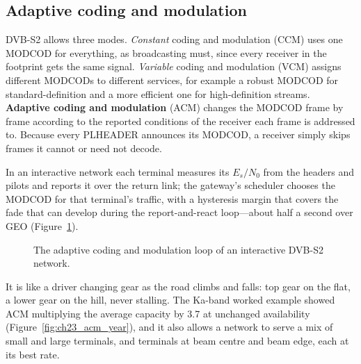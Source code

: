 \subsection{Adaptive coding and modulation}

DVB-S2 allows three modes. \emph{Constant} coding and modulation (CCM) uses one MODCOD for
everything, as broadcasting must, since every receiver in the footprint gets the same signal.
\emph{Variable} coding and modulation (VCM) assigns different MODCODs to different services,
for example a robust MODCOD for standard-definition and a more efficient one for
high-definition streams. \textbf{Adaptive coding and modulation} (ACM) changes the MODCOD frame by
frame according to the reported conditions of the receiver each frame is addressed to. Because
every PLHEADER announces its MODCOD, a receiver simply skips frames it cannot or need not
decode.


In an interactive network each terminal measures its $E_s/N_0$ from the headers and pilots and
reports it over the return link; the gateway's scheduler chooses the MODCOD for that terminal's
traffic, with a hysteresis margin that covers the fade that can develop during the
report-and-react loop---about half a second over GEO (Figure~\ref{fig:ch23_acm_loop}).

\begin{figure}[H]\centering
{}
\caption{The adaptive coding and modulation loop of an interactive DVB-S2 network.}
\label{fig:ch23_acm_loop}
\end{figure}
 It is like a driver changing gear as the road
climbs and falls: top gear on the flat, a lower gear on the hill, never stalling. The Ka-band
worked example showed ACM multiplying the average capacity by 3.7 at unchanged availability
(Figure~\ref{fig:ch23_acm_year}), and
it also allows a network to serve a mix of small and large terminals, and terminals at beam centre
and beam edge, each at its best rate.

